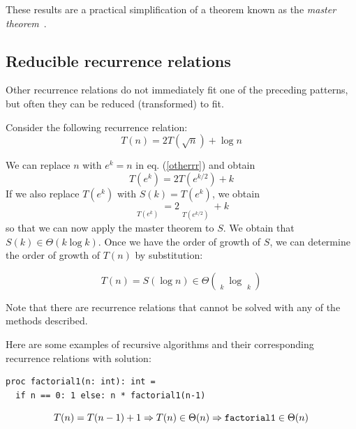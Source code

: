 \documentclass[justified, sixbynine]{tufte-book}
\def\stackunder#1#2{\mathrel{\mathop{#2}\limits_{#1}}}
\theoremstyle{plain}%
\newtheorem * {corollary}{Corollary}
\theoremstyle{definition}
\theoremstyle{remark}
\newtheorem * {remark}{Remark}
\newtheorem * {note}{Note}
\begin{document}
\begin{fullwidth}

These results are a practical simplification of a theorem known as the {\it master theorem}~\cite{mastertheorem}.

\goodbreak\subsection{Reducible recurrence relations}

Other recurrence relations do not immediately fit one of the preceding patterns, but often they can be reduced (transformed) to fit.

Consider the following recurrence relation:
\begin{equation}
T(n)=
2T(\sqrt{n})+\log n
\label{otherrr}
\end{equation}

We can replace $n$ with $e^k=n$ in eq. (\ref{otherrr}) and obtain
\begin{equation}
T(e^k)=
2T(e^{k/2})+k
\end{equation}
If we also replace $T(e^k)$ with $S(k)=T(e^k)$, we obtain
\begin{equation}
\stackunder{T(e^k)}{\underbrace{S(k)}}=
2\stackunder{T(e^{k/2})}{\underbrace{S(k/2)}}+k
\end{equation}
so that we can now apply the master theorem to $S$. We obtain that $S(k)\in
\Theta (k\log k)$. Once we have the order of growth of $S$, we can determine
the order of growth of $T(n)$ by substitution:

\begin{equation}
T(n)=S(\log n)\in \Theta (\stackunder{k}{\underbrace{\log n}}\log
\stackunder{k}{\underbrace{\log n}})
\end{equation}

Note that there are recurrence relations that cannot be solved with any of
the methods described.

Here are some examples of recursive algorithms and their corresponding recurrence relations with solution:

\begin{lstlisting}
proc factorial1(n: int): int =
  if n == 0: 1 else: n * factorial1(n-1)
\end{lstlisting}

\begin{equation}
T(n)=T(n-1)+1\Rightarrow T(n)\in \Theta (n)\Rightarrow \text{{\tt factorial1}%
}\in \Theta (n)
\end{equation}


\end{fullwidth}
\end{document}
